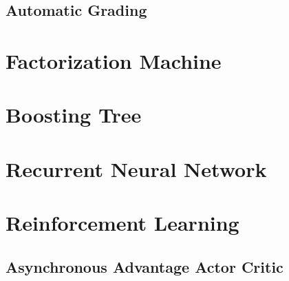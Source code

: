    \subsection{Automatic Grading}

\section{Factorization Machine}

\section{Boosting Tree}

\section{Recurrent Neural Network}

\section{Reinforcement Learning}

    \subsection{Asynchronous Advantage Actor Critic}
